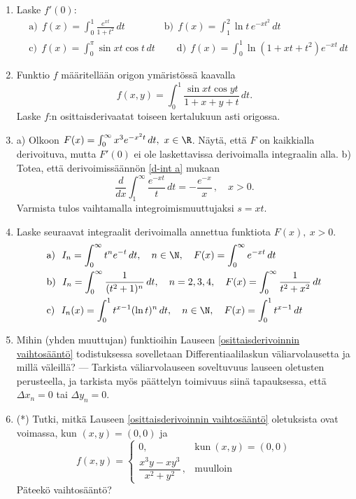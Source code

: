 \begin{enumerate}
\item
Laske $f'(0)$:
\begin{align*}
&\text{a)}\ \ f(x)=\int_0^1 \frac{e^{xt}}{1+t^2}\,dt \qquad\qquad
 \text{b)}\ \ f(x)=\int_1^2 \ln t\,e^{-xt^2}\,dt \\
&\text{c)}\ \ f(x)=\int_0^\pi \sin xt\cos t\,dt \qquad\
 \text{d)}\ \ f(x)=\int_0^1 \ln(1+xt+t^2)e^{-xt}\,dt
\end{align*}

\item
Funktio $f$ määritellään origon ymäristössä kaavalla
\[
f(x,y)=\int_0^1 \frac{\sin xt\cos yt}{1+x+y+t}\,dt.
\]
Laske $f$:n osittaisderivaatat toiseen kertalukuun asti origossa.

\item \label{H-udif-1: poikkeus}
a) Olkoon $F(x)=\int_0^\infty x^3 e^{-x^2 t}\,dt,\ x\in\R$. Näytä, että $F$ on kaikkialla 
derivoituva, mutta $F'(0)$ ei ole laskettavissa derivoimalla integraalin alla. \newline
b) Totea, että derivoimissäännön \eqref{d-int a} mukaan
\[
\frac{d}{dx} \int_1^\infty \frac{e^{-xt}}{t}\,dt = -\frac{e^{-x}}{x}\,, \quad x>0.
\]
Varmista tulos vaihtamalla integroimismuuttujaksi $s=xt$.

\item
Laske seuraavat integraalit derivoimalla annettua funktiota $F(x),\ x>0$.
\begin{align*}
&\text{a)}\ \ I_n=\int_0^\infty t^n e^{-t}\,dt, \quad n\in\N, \quad 
                    F(x)=\int_0^\infty e^{-xt}\,dt \\
&\text{b)}\ \ I_n=\int_0^\infty \frac{1}{(t^2+1)^n}\,dt, \quad n=2,3,4, \quad
                    F(x)=\int_0^\infty \frac{1}{t^2+x^2}\,dt \\
&\text{c)}\ \ I_n(x)=\int_0^1 t^{x-1}(\ln t)^n\,dt,\quad n\in\N,\quad F(x)=\int_0^1 t^{x-1}\,dt
\end{align*}

\item \label{H-udif-2: perusteluja}
Mihin (yhden muuttujan) funktioihin Lauseen \ref{osittaisderivoinnin vaihtosääntö}
todistuksessa sovelletaan Differentiaalilaskun väliarvolausetta ja millä väleillä? --- Tarkista
väliarvolauseen soveltuvuus lauseen oletusten perusteella, ja tarkista myös päättelyn toimivuus
siinä tapauksessa, että $\Delta x_n=0$ tai $\Delta y_n=0$.

\item(*)
Tutki, mitkä Lauseen \ref{osittaisderivoinnin vaihtosääntö} oletuksista ovat voimassa, kun
$(x,y)=(0,0)$ ja
\[
f(x,y) = \begin{cases}
         0, &\text{kun}\ (x,y)=(0,0) \\[2mm] \dfrac{x^3y-xy^3}{x^2+y^2}\,, &\text{muulloin}
         \end{cases}
\]
Päteekö vaihtosääntö?  


\end{enumerate}
